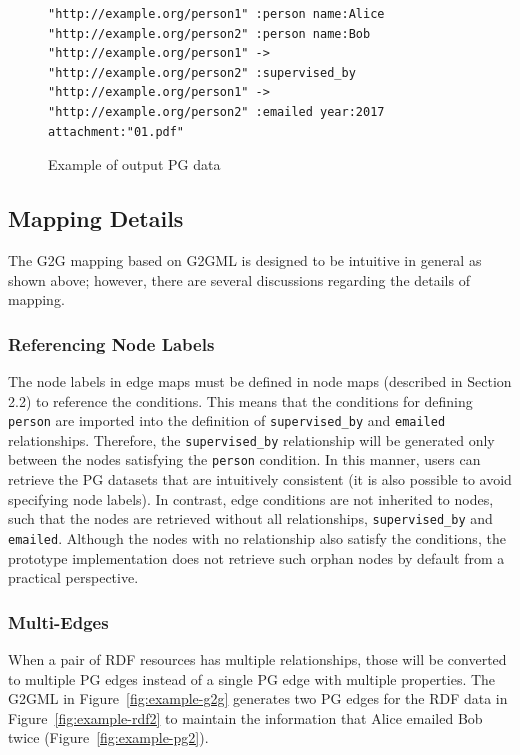 \documentclass[runningheads]{llncs}
\begin{document}
\begin{figure}[!t]
\begin{scriptsize}
\begin{verbatim}
"http://example.org/person1" :person name:Alice
"http://example.org/person2" :person name:Bob
"http://example.org/person1" -> "http://example.org/person2" :supervised_by
"http://example.org/person1" -> "http://example.org/person2" :emailed year:2017 attachment:"01.pdf"
\end{verbatim}
\end{scriptsize}
\caption{Example of output PG data}
\label{fig:output-pg}
\end{figure}


\subsection{Mapping Details}
\label{subsec:mapping-details}
The G2G mapping based on G2GML is designed to be intuitive in general as shown above; however, there are several discussions regarding the details of mapping.

\subsubsection{Referencing Node Labels}
The node labels in edge maps must be defined in node maps (described in Section 2.2) to reference the conditions. This means that the conditions for defining \texttt{person} are imported into the definition of \texttt{supervised\_by} and \texttt{emailed} relationships. Therefore, the \texttt{supervised\_by} relationship will be generated only between the nodes satisfying the \texttt{person} condition. In this manner, users can retrieve the PG datasets that are intuitively consistent (it is also possible to avoid specifying node labels). In contrast, edge conditions are not inherited to nodes, such that the nodes are retrieved without all relationships, \texttt{supervised\_by} and \texttt{emailed}. Although the nodes with no relationship also satisfy the conditions, the prototype implementation does not retrieve such orphan nodes by default from a practical perspective.

\subsubsection{Multi-Edges}
When a pair of RDF resources has multiple relationships, those will be converted to multiple PG edges instead of a single PG edge with multiple properties. The G2GML in Figure~\ref{fig:example-g2g} generates two PG edges for the RDF data in Figure~\ref{fig:example-rdf2} to maintain the information that Alice emailed Bob twice (Figure~\ref{fig:example-pg2}).
\end{document}
